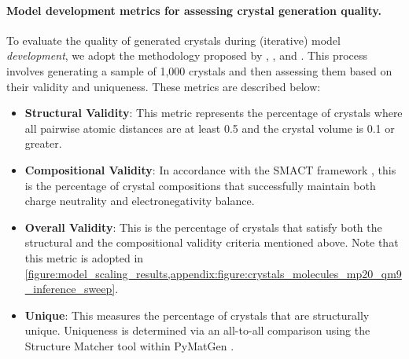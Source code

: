 \documentclass{article}
\theoremstyle{plain}
\theoremstyle{definition}
\theoremstyle{remark}
\begin{document}
\paragraph{Model development metrics for assessing crystal generation quality.}
To evaluate the quality of generated crystals during (iterative) model \textit{development}, we adopt the methodology proposed by \citet{xie2022crystal}, \citet{miller2024flowmm}, and \citet{joshi2025allatom}. This process involves generating a sample of 1,000 crystals and then assessing them based on their validity and uniqueness. These metrics are described below:
\begin{itemize}
    \item \textbf{Structural Validity}: This metric represents the percentage of crystals where all pairwise atomic distances are at least 0.5 and the crystal volume is 0.1 or greater.
    \item \textbf{Compositional Validity}: In accordance with the SMACT framework \citep{davies2019smact}, this is the percentage of crystal compositions that successfully maintain both charge neutrality and electronegativity balance.
    \item \textbf{Overall Validity}: This is the percentage of crystals that satisfy both the structural and the compositional validity criteria mentioned above. Note that this metric is adopted in \cref{figure:model_scaling_results,appendix:figure:crystals_molecules_mp20_qm9_inference_sweep}.
    \item \textbf{Unique}: This measures the percentage of crystals that are structurally unique. Uniqueness is determined via an all-to-all comparison using the Structure Matcher tool within PyMatGen \citep{ong2013python}.
\end{itemize}
\end{document}

